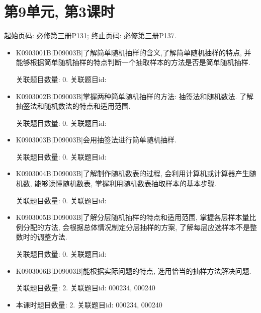 \section*{第9单元, 第3课时}
起始页码: 必修第三册P131; 终止页码: 必修第三册P137.
\begin{itemize}
\item K0903001B|D09003B|了解简单随机抽样的含义,了解简单随机抽样的特点, 并能够根据简单随机抽样的特点判断一个抽取样本的方法是否是简单随机抽样.

关联题目数量: 0. 关联题目id: 

\item K0903002B|D09003B|掌握两种简单随机抽样的方法: 抽签法和随机数法. 了解抽签法和随机数法的特点和适用范围.

关联题目数量: 0. 关联题目id: 

\item K0903003B|D09003B|会用抽签法进行简单随机抽样.

关联题目数量: 0. 关联题目id: 

\item K0903004B|D09003B|了解制作随机数表的过程, 会利用计算机或计算器产生随机数, 能够读懂随机数表, 掌握利用随机数表抽取样本的基本步骤.

关联题目数量: 0. 关联题目id: 

\item K0903005B|D09003B|了解分层随机抽样的特点和适用范围, 掌握各层样本量比例分配的方法, 会根据总体情况制定分层抽样的方案, 了解每层应选样本不是整数时的调整方法.

关联题目数量: 0. 关联题目id: 

\item K0903006B|D09003B|能根据实际问题的特点, 选用恰当的抽样方法解决问题.

关联题目数量: 2. 关联题目id: 000234, 000240

\item 本课时题目数量: 2. 关联题目id: 000234, 000240

\end{itemize}

